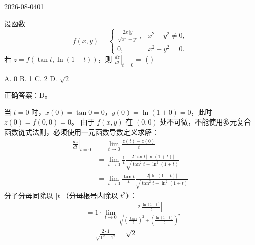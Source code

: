 \begin{mistake}{2026-08-04}{01}

\begin{problemcontent}
设函数
\[
f(x, y) = \begin{cases} 
\frac{2x|y|}{\sqrt{x^2+y^2}}, & x^2+y^2 \neq 0, \\ 
0, & x^2+y^2 = 0. 
\end{cases}
\]
若 \(z = f(\tan t, \ln(1+t))\)，则 \(\left. \frac{dz}{dt} \right|_{t=0} = \) ( )

A. 0 \quad B. 1 \quad C. 2 \quad D. \(\sqrt{2}\)
\end{problemcontent}

\begin{solutioncontent}
正确答案：D。

当 \(t=0\) 时，\(x(0) = \tan 0 = 0\)，\(y(0) = \ln(1+0) = 0\)，此时 \(z(0) = f(0, 0) = 0\)。
由于 \(f(x,y)\) 在 \((0,0)\) 处不可微，不能使用多元复合函数链式法则，必须使用一元函数导数定义求解：
\[
\begin{aligned}
\left. \frac{dz}{dt} \right|_{t=0} &= \lim_{t \to 0} \frac{z(t) - z(0)}{t} \\
&= \lim_{t \to 0} \frac{1}{t} \frac{2\tan t |\ln(1+t)|}{\sqrt{\tan^2 t + \ln^2(1+t)}} \\
&= \lim_{t \to 0} \frac{\tan t}{t} \frac{2|\ln(1+t)|}{\sqrt{\tan^2 t + \ln^2(1+t)}}
\end{aligned}
\]
分子分母同除以 \(|t|\)（分母根号内除以 \(t^2\)）：
\[
\begin{aligned}
&= 1 \cdot \lim_{t \to 0} \frac{2 \left| \frac{\ln(1+t)}{t} \right|}{\sqrt{\left(\frac{\tan t}{t}\right)^2 + \left(\frac{\ln(1+t)}{t}\right)^2}} \\
&= \frac{2 \cdot 1}{\sqrt{1^2 + 1^2}} = \sqrt{2}
\end{aligned}
\]
\end{solutioncontent}


\end{mistake}
